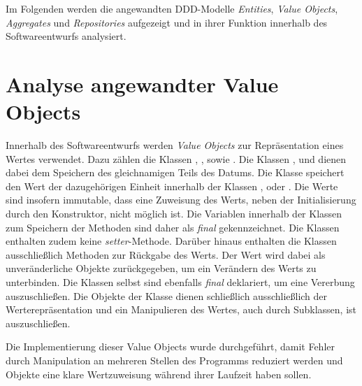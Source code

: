 Im Folgenden werden die angewandten \ac{DDD}-Modelle \textit{Entities}, \textit{Value Objects}, \textit{Aggregates} und \textit{Repositories} aufgezeigt und in ihrer Funktion innerhalb des Softwareentwurfs analysiert.

\section{Analyse angewandter Value Objects}
\label{domaindrivendesign>valueobjects}
Innerhalb des Softwareentwurfs werden \textit{Value Objects} zur Repräsentation eines Wertes verwendet.
Dazu zählen die Klassen \href{}{}, \href{}{}, \href{}{} sowie \href{}{}.
Die Klassen \href{}{}, \href{}{} und \href{}{} dienen dabei dem Speichern des gleichnamigen Teils des Datums.
Die Klasse \href{}{} speichert den Wert der dazugehörigen Einheit innerhalb der Klassen \href{}{}, \href{}{} oder \href{}{}.
Die Werte sind insofern immutable, dass eine Zuweisung des Werts, neben der Initialisierung durch den Konstruktor, nicht möglich ist.
Die Variablen innerhalb der Klassen zum Speichern der Methoden sind daher als \textit{final} gekennzeichnet.
Die Klassen enthalten zudem keine \textit{setter}-Methode.
Darüber hinaus enthalten die Klassen ausschließlich Methoden zur Rückgabe des Werts.
Der Wert wird dabei als unveränderliche Objekte zurückgegeben, um ein Verändern des Werts zu unterbinden.
Die Klassen selbst sind ebenfalls \textit{final} deklariert, um eine Vererbung auszuschließen.
Die Objekte der Klasse dienen schließlich ausschließlich der Werterepräsentation und ein Manipulieren des Wertes, auch durch Subklassen, ist auszuschließen.

Die Implementierung dieser Value Objects wurde durchgeführt, damit Fehler durch Manipulation an mehreren Stellen des Programms reduziert werden und Objekte eine klare Wertzuweisung während ihrer Laufzeit haben sollen.

